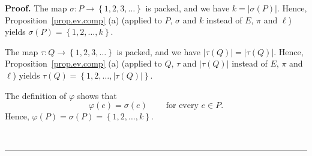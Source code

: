 \documentclass[numbers=enddot,12pt,final,onecolumn,notitlepage,abstracton]{scrartcl}
\theoremstyle{definition}
\newenvironment{proof}[1][Proof]{\noindent\textbf{#1.} }{\ \rule{0.5em}{0.5em}}
\newenvironment{verlong}{}{}
\begin{document}
\begin{verlong}
\begin{proof}
The map $\sigma : P \to \left\{ 1, 2, 3, \ldots \right\}$ is packed,
and we have
$k = \left\vert \sigma\left(  P\right)  \right\vert$.
Hence, Proposition~\ref{prop.ev.comp} (a) (applied to $P$, $\sigma$ and
$k$ instead of $E$, $\pi$ and $\ell$)
yields $\sigma\left(  P\right)  = \left\{ 1,2,\ldots,k\right\}  $.

The map $\tau : Q \to \left\{ 1, 2, 3, \ldots \right\}$ is packed,
and we have
$\left\vert \tau\left(  Q\right)  \right\vert
= \left\vert \tau\left(  Q\right)  \right\vert$.
Hence, Proposition~\ref{prop.ev.comp} (a) (applied to $Q$, $\tau$ and
$\left\vert \tau\left(  Q\right)  \right\vert$ instead of
$E$, $\pi$ and $\ell$)
yields $\tau\left(  Q\right)  =\left\{
1,2,\ldots,\left\vert \tau\left(  Q\right)  \right\vert \right\}  $.

The definition of $\varphi$ shows that%
\begin{equation}
\varphi\left(  e\right)  =\sigma\left(  e\right)
\ \ \ \ \ \ \ \ \ \ \text{for every }e\in P.
\label{pf.lem.Gammaw.coprod.bij.b.1o}%
\end{equation}
Hence, $\varphi\left(  P\right)  =\sigma\left(  P\right)
=\left\{  1,2,\ldots,k\right\}  $.


\end{proof}
\end{verlong}
\end{document}
